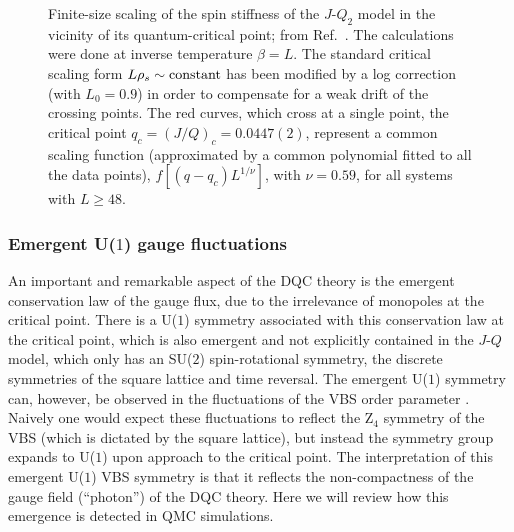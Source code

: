 \documentclass[range]{ar2e}
\begin{document}
\begin{figure}
\centerline{}
\caption{Finite-size scaling of the spin stiffness of the $J$-$Q_2$ model in the vicinity of its quantum-critical point; from Ref.~\cite{Sandvik10c}. The 
calculations were done at inverse temperature $\beta=L$. The standard critical scaling form $L\rho_s \sim {\rm constant}$ has been modified by a log correction 
(with $L_0=0.9$) in order to compensate for a weak drift of the crossing points. The red curves, which cross at a single point, the critical point $q_c=(J/Q)_c = 0.0447(2)$, 
represent a common scaling function (approximated by a common polynomial fitted to all the data points), $f[(q-q_c)L^{1/\nu}]$, with $\nu=0.59$, for all systems 
with $L\ge 48$.}
\label{jqrhos}
\end{figure}

\subsubsection{Emergent U($1$) gauge fluctuations}

An important and remarkable aspect of the DQC theory is the emergent conservation law of the gauge flux, due to the irrelevance of monopoles at the critical point. 
There is a U($1$) symmetry associated with this conservation law at the critical point, which is also emergent and not explicitly contained in 
the $J$-$Q$ model, which only has an SU($2$) spin-rotational symmetry, the discrete symmetries of the square lattice and time reversal. The emergent U($1$) 
symmetry can, however, be observed in the fluctuations of the VBS order parameter \cite{Sandvik07}. Naively one would expect these fluctuations 
to reflect the Z$_4$ symmetry of the VBS (which is dictated by the square lattice), but instead the symmetry group expands to U($1$) upon approach to the 
critical point. The interpretation of this emergent U($1$) VBS symmetry is that it reflects the non-compactness of the gauge field (``photon'') 
of the DQC theory. Here we will review how this emergence is detected in QMC simulations.
\end{document}
